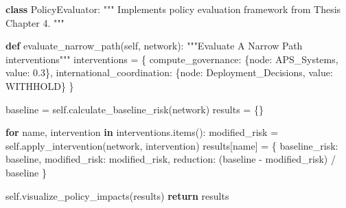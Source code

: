 \documentclass[
  11pt,
  letterpaper,
]{book}
\newenvironment{Shaded}{\begin{snugshade}}{\end{snugshade}}
\newcommand{\CommentTok}[1]{\textcolor[rgb]{0.37,0.37,0.37}{#1}}
\newcommand{\ControlFlowTok}[1]{\textcolor[rgb]{0.00,0.23,0.31}{\textbf{#1}}}
\newcommand{\FloatTok}[1]{\textcolor[rgb]{0.68,0.00,0.00}{#1}}
\newcommand{\KeywordTok}[1]{\textcolor[rgb]{0.00,0.23,0.31}{\textbf{#1}}}
\newcommand{\NormalTok}[1]{\textcolor[rgb]{0.00,0.23,0.31}{#1}}
\newcommand{\OperatorTok}[1]{\textcolor[rgb]{0.37,0.37,0.37}{#1}}
\newcommand{\StringTok}[1]{\textcolor[rgb]{0.13,0.47,0.30}{#1}}
\newcommand{\VariableTok}[1]{\textcolor[rgb]{0.07,0.07,0.07}{#1}}
\begin{document}
\begin{Shaded}
\begin{Highlighting}[]
\KeywordTok{class}\NormalTok{ PolicyEvaluator:}
    \CommentTok{"""}
\CommentTok{    Implements policy evaluation framework from Thesis Chapter 4.}
\CommentTok{    """}
    
    \KeywordTok{def}\NormalTok{ evaluate\_narrow\_path(}\VariableTok{self}\NormalTok{, network):}
        \CommentTok{"""Evaluate \textquotesingle{}A Narrow Path\textquotesingle{} interventions"""}
\NormalTok{        interventions }\OperatorTok{=}\NormalTok{ \{}
            \StringTok{\textquotesingle{}compute\_governance\textquotesingle{}}\NormalTok{: \{}\StringTok{\textquotesingle{}node\textquotesingle{}}\NormalTok{: }\StringTok{\textquotesingle{}APS\_Systems\textquotesingle{}}\NormalTok{, }\StringTok{\textquotesingle{}value\textquotesingle{}}\NormalTok{: }\FloatTok{0.3}\NormalTok{\},}
            \StringTok{\textquotesingle{}international\_coordination\textquotesingle{}}\NormalTok{: \{}\StringTok{\textquotesingle{}node\textquotesingle{}}\NormalTok{: }\StringTok{\textquotesingle{}Deployment\_Decisions\textquotesingle{}}\NormalTok{, }\StringTok{\textquotesingle{}value\textquotesingle{}}\NormalTok{: }\StringTok{\textquotesingle{}WITHHOLD\textquotesingle{}}\NormalTok{\}}
\NormalTok{        \}}
        
\NormalTok{        baseline }\OperatorTok{=} \VariableTok{self}\NormalTok{.calculate\_baseline\_risk(network)}
\NormalTok{        results }\OperatorTok{=}\NormalTok{ \{\}}
        
        \ControlFlowTok{for}\NormalTok{ name, intervention }\KeywordTok{in}\NormalTok{ interventions.items():}
\NormalTok{            modified\_risk }\OperatorTok{=} \VariableTok{self}\NormalTok{.apply\_intervention(network, intervention)}
\NormalTok{            results[name] }\OperatorTok{=}\NormalTok{ \{}
                \StringTok{\textquotesingle{}baseline\_risk\textquotesingle{}}\NormalTok{: baseline,}
                \StringTok{\textquotesingle{}modified\_risk\textquotesingle{}}\NormalTok{: modified\_risk,}
                \StringTok{\textquotesingle{}reduction\textquotesingle{}}\NormalTok{: (baseline }\OperatorTok{{-}}\NormalTok{ modified\_risk) }\OperatorTok{/}\NormalTok{ baseline}
\NormalTok{            \}}
            
        \VariableTok{self}\NormalTok{.visualize\_policy\_impacts(results)}
        \ControlFlowTok{return}\NormalTok{ results}
\end{Highlighting}
\end{Shaded}
\end{document}
